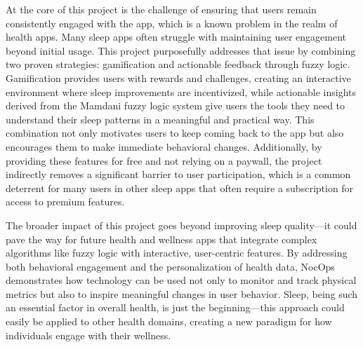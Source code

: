 \documentclass[10pt,twocolumn]{article}
\begin{document}
At the core of this project is the challenge of ensuring that users remain consistently engaged with the app, which is a known problem in the realm of health apps. Many sleep apps often struggle with maintaining user engagement beyond initial usage. This project purposefully addresses that issue by combining two proven strategies: gamification and actionable feedback through fuzzy logic. Gamification provides users with rewards and challenges, creating an interactive environment where sleep improvements are incentivized, while actionable insights derived from the Mamdani fuzzy logic system give users the tools they need to understand their sleep patterns in a meaningful and practical way. This combination not only motivates users to keep coming back to the app but also encourages them to make immediate behavioral changes. Additionally, by providing these features for free and not relying on a paywall, the project indirectly removes a significant barrier to user participation, which is a common deterrent for many users in other sleep apps that often require a subscription for access to premium features.

The broader impact of this project goes beyond improving sleep quality—it could pave the way for future health and wellness apps that integrate complex algorithms like fuzzy logic with interactive, user-centric features. By addressing both behavioral engagement and the personalization of health data, NocOps demonstrates how technology can be used not only to monitor and track physical metrics but also to inspire meaningful changes in user behavior. Sleep, being such an essential factor in overall health, is just the beginning—this approach could easily be applied to other health domains, creating a new paradigm for how individuals engage with their wellness.

\printbibliography
\end{document}
